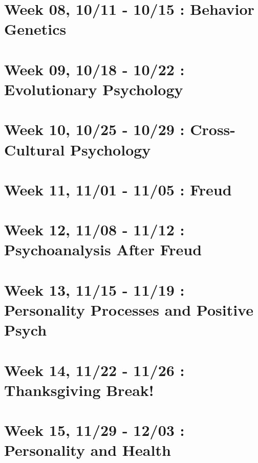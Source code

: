 \hypertarget{week-08-1011---1015-behavior-genetics}{%
\section*{Week 08, 10/11 - 10/15 : Behavior Genetics}\label{week-08-1011---1015-behavior-genetics}}


\hypertarget{week-09-1018---1022-evolutionary-psychology}{%
\section*{Week 09, 10/18 - 10/22 : Evolutionary Psychology}\label{week-09-1018---1022-evolutionary-psychology}}


\hypertarget{week-10-1025---1029-cross-cultural-psychology}{%
\section*{Week 10, 10/25 - 10/29 : Cross-Cultural Psychology}\label{week-10-1025---1029-cross-cultural-psychology}}


\hypertarget{week-11-1101---1105-freud}{%
\section*{Week 11, 11/01 - 11/05 : Freud}\label{week-11-1101---1105-freud}}


\hypertarget{week-12-1108---1112-psychoanalysis-after-freud}{%
\section*{Week 12, 11/08 - 11/12 : Psychoanalysis After Freud}\label{week-12-1108---1112-psychoanalysis-after-freud}}


\hypertarget{week-13-1115---1119-personality-processes-and-positive-psych}{%
\section*{Week 13, 11/15 - 11/19 : Personality Processes and Positive Psych}\label{week-13-1115---1119-personality-processes-and-positive-psych}}


\hypertarget{week-14-1122---1126-thanksgiving-break}{%
\section*{Week 14, 11/22 - 11/26 : Thanksgiving Break!}\label{week-14-1122---1126-thanksgiving-break}}


\hypertarget{week-15-1129---1203-personality-and-health}{%
\section*{Week 15, 11/29 - 12/03 : Personality and Health}\label{week-15-1129---1203-personality-and-health}}


